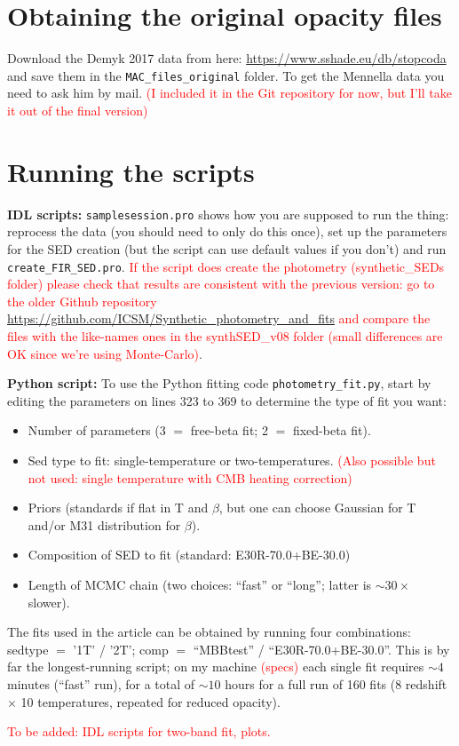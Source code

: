 \documentclass{article}
\begin{document}
\section*{Obtaining the original opacity files}
Download the Demyk 2017 data from here: \url{https://www.sshade.eu/db/stopcoda}
and save them in the {\tt MAC\_files\_original} folder. To get the Mennella data you need to ask him by mail. \textcolor{red}{(I included it in the Git repository for now, but I'll take it out of the final version)}


\section*{Running the scripts}

{\bf IDL scripts:}
{\tt samplesession.pro} shows how you are supposed to run the thing: reprocess the data (you should need to only do this once), set up the parameters for the SED creation (but the script can use default values if you don't) and run {\tt create\_FIR\_SED.pro}.
\textcolor{red}{If the script does create the photometry (synthetic\_SEDs folder) please check that results are consistent with the previous version: go to the older Github repository \url{https://github.com/ICSM/Synthetic_photometry_and_fits} and compare the files with the like-names ones in the synthSED\_v08 folder (small differences are OK since we're using Monte-Carlo)}.

{\bf Python script:}
To use the Python fitting code {\tt photometry\_fit.py}, start by editing the parameters on lines 323 to 369 to determine the type of fit you want:
\begin{itemize}
\item Number of parameters (3 $=$ free-beta fit; 2 $=$ fixed-beta fit). 
\item Sed type to fit: single-temperature or two-temperatures. \textcolor{red}{(Also possible but not used: single temperature with CMB heating correction)}
\item Priors (standards if flat in T and $\beta$, but one can choose Gaussian for T and/or M31 distribution for $\beta$).
\item Composition of SED to fit (standard: E30R-70.0+BE-30.0)
\item Length of MCMC chain (two choices: ``fast'' or ``long''; latter is $\sim 30 \times$ slower).
\end{itemize}
The fits used in the article can be obtained by running four combinations: sedtype $=$ '1T' / '2T'; comp $=$ ``MBBtest'' / ``E30R-70.0+BE-30.0''. This is by far the longest-running script; on my machine \textcolor{red}{(specs)} each single fit requires $\sim4$ minutes (``fast'' run),  for a total of $\sim10$ hours for a full run of 160 fits (8 redshift $\times$ 10 temperatures, repeated for reduced opacity).

\textcolor{red}{To be added: IDL scripts for two-band fit, plots.}
\end{document}
